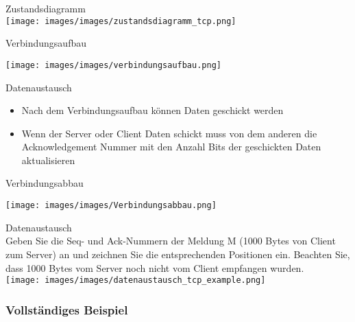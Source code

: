 \begin{concept}{Zustandsdiagramm}\\
    \texttt{[image: images/images/zustandsdiagramm\_tcp.png]}
\end{concept}

\begin{KR}{Verbindungsaufbau}
    \begin{center}
        \texttt{[image: images/images/verbindungsaufbau.png]}
    \end{center}
\end{KR}

\begin{KR}{Datenaustausch}
    \begin{itemize}
        \item Nach dem Verbindungsaufbau können Daten geschickt werden
        \item Wenn der Server oder Client Daten schickt muss von dem anderen die Acknowledgement Nummer
        mit den Anzahl Bits der geschickten Daten aktualisieren
    \end{itemize}
\end{KR}

\begin{KR}{Verbindungsabbau}
    \begin{center}
        \texttt{[image: images/images/Verbindungsabbau.png]}
    \end{center}
\end{KR}

\begin{example2}{Datenaustausch}\\
    Geben Sie die Seq- und Ack-Nummern der Meldung M (1000 Bytes von Client zum Server) an und zeichnen Sie die entsprechenden Positionen ein. Beachten Sie, dass 1000 Bytes vom Server noch nicht vom Client empfangen wurden.\\
    \texttt{[image: images/images/datenaustausch\_tcp\_example.png]}
\end{example2}

\subsubsection*{Vollständiges Beispiel}

